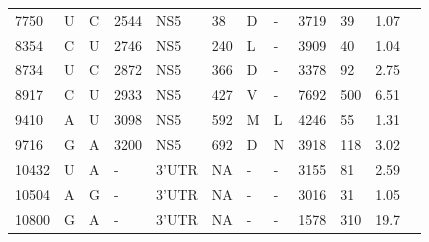 \begin{longtabu}{X[l]X[l]X[l]X[l]X[l]X[l]X[l]X[l]X[l]X[l]X[l]X[l]}
		7750     & U    & C            & 2544              & NS5   & 38          & D                  & -                 & 3719           & 39               & 1.07   \\
		8354     & C    & U            & 2746              & NS5   & 240         & L                  & -                 & 3909           & 40               & 1.04   \\
		8734     & U    & C            & 2872              & NS5   & 366         & D                  & -                 & 3378           & 92               & 2.75   \\
		8917     & C    & U            & 2933              & NS5   & 427         & V                  & -                 & 7692           & 500              & 6.51   \\
		9410   & A    & U            & 3098              & NS5   & 592         & M                  & L               & 4246           & 55               & 1.31   \\
		9716     & G    & A            & 3200              & NS5   & 692         & D                  & N               & 3918           & 118              & 3.02   \\
		10432    & U    & A            & -                 & 3'UTR & NA          & -                    & -                 & 3155           & 81               & 2.59   \\
		10504    & A    & G            & -                 & 3'UTR & NA          & -                    & -                 & 3016           & 31               & 1.05   \\
		10800    & G    & A          & -                 & 3'UTR & NA          & -                    & -                 & 1578           & 310              & 19.7   \\ 
		\bottomrule
	\end{longtabu}

